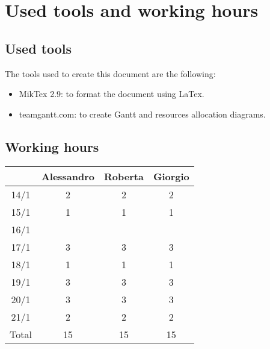 \chapter{Used tools and working hours}

\section{Used tools}

The tools used to create this document are the following:
\begin{itemize}
\item MikTex 2.9: to format the document using LaTex.
\item teamgantt.com: to create Gantt and resources allocation diagrams.
\end{itemize}

\section{Working hours}

\begin{table}[!h]
\begin{tabular}{c|c|c|c}
\centering
      & Alessandro & Roberta & Giorgio \\ \hline
14/1  &  2   &  2   &  2    \\ \hline
15/1  &  1   & 1    & 1     \\ \hline
16/1  &      &     &    \\ \hline
17/1  &  3   & 3     & 3  \\ \hline
18/1 &  1   & 1    &  1    \\ \hline
19/1 &   3   &  3    &  3  \\ \hline
20/1 &  3   & 3    & 3  \\ \hline
21/1 &  2   & 2    & 2   \\ \hline
Total & 15   & 15   & 15
\end{tabular}
\end{table}